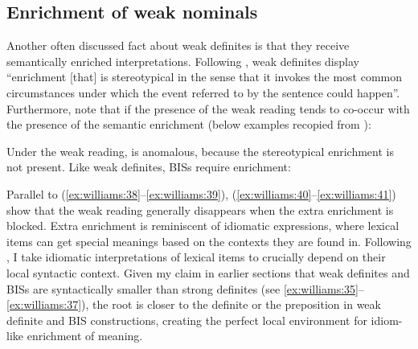 \documentclass[output=paper,
modfonts
]{langscibook}
\begin{document}
\subsection{Enrichment of weak nominals}

Another often discussed fact about weak definites is that they receive semantically enriched interpretations. Following \citet[182]{Aguilar-GuevaraZwarsts2011}, weak definites display ``enrichment [that] is stereotypical in the sense that it invokes the most common circumstances under which the event referred to by the sentence could happen''. Furthermore, \citeauthor{Aguilar-GuevaraZwarsts2011} note that if the presence of the weak reading tends to co-occur with the presence of the semantic enrichment (below examples recopied from \citealt[182, ex. 10b, 11b]{Aguilar-GuevaraZwarsts2011}):

\begin{exe}
\end{exe}

Under the weak reading,  is anomalous, because the stereotypical enrichment is not present. Like weak definites, BISs require enrichment:

\begin{exe}
   	
\end{exe}

Parallel to (\ref{ex:williams:38}--\ref{ex:williams:39}), (\ref{ex:williams:40}--\ref{ex:williams:41}) show that the weak reading generally disappears when the extra enrichment is blocked. Extra enrichment is  reminiscent of idiomatic expressions, where lexical items can get special meanings based on the contexts they are found in. Following \citep[208]{Marantz1997}, I take idiomatic interpretations of lexical items to crucially depend on their local syntactic context. Given my claim in earlier sections that weak definites and BISs are syntactically smaller than strong definites (see \ref{ex:williams:35}--\ref{ex:williams:37}), the root is closer to the definite or the preposition in weak definite and BIS constructions, creating the perfect local environment for idiom-like enrichment of meaning.
\end{document}
